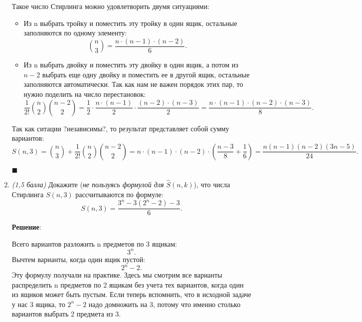\documentclass{article}
\begin{document}
\begin{enumerate}
    Такое число Стирлинга можно удовлетворить двумя ситуациями:
    \begin{itemize}
        \item Из n выбрать тройку и поместить эту тройку в один ящик, остальные заполняются по одному элементу:
        \begin{equation}
            \binom{n}{3} = \frac{n \cdot (n-1) \cdot (n-2)}{6}.
        \end{equation}
        \item Из n выбрать двойку и поместить эту двойку в один ящик, а потом из $n-2$ выбрать еще одну двойку и поместить ее в другой ящик, остальные заполняются автоматически. Так как нам не важен порядок этих пар, то нужно поделить на число перестановок:
        \begin{equation}
            \frac{1}{2!}\binom{n}{2}\binom{n-2}{2} = \frac{1}{2}\cdot\frac{n \cdot (n-1)}{2} \cdot \frac{(n-2) \cdot (n-3)}{2} = \frac{n \cdot (n-1)\cdot(n-2) \cdot (n-3)}{8}.
        \end{equation}
    \end{itemize}
    Так как ситации ?независимы?, то результат представляет собой сумму вариантов:
    \begin{equation}
        S(n,3) = \binom{n}{3} + \frac{1}{2!}\binom{n}{2}\binom{n-2}{2} = n \cdot (n-1) \cdot (n-2) \cdot \left(\frac{n-3}{8} + \frac{1}{6}\right) = \frac{n(n-1)(n-2)(3n-5)}{24}.
    \end{equation}


    \begin{flushright}
        $\blacksquare$
    \end{flushright}

    
    \item \textit{(1,5 балла)} Докажите (\textit{не пользуясь формулой для $\hat{S}(n,k)$}), что числа Стирлинга $S(n,3)$ рассчитываются по формуле:
    $$S(n,3)=\frac{3^n-3(2^n-2)-3}{6}.$$

    
    \textbf{Решение}:

    Всего вариантов разложить n предметов по 3 ящикам:
    \begin{equation}
        3^n.
    \end{equation}
    Вычтем варианты, когда один ящик пустой:
    \begin{equation}
        2^n - 2.
    \end{equation}
    Эту формулу получали на практике. Здесь мы смотрим все варианты распределить n предметов по 2 ящикам без учета тех вариантов, когда один из ящиков может быть пустым. Если теперь вспомнить, что в исходной задаче у нас 3 ящика, то $2^n - 2$ надо домножить на 3, потому что именно столько вариантов выбрать 2 предмета из 3.


\end{enumerate}
\end{document}
